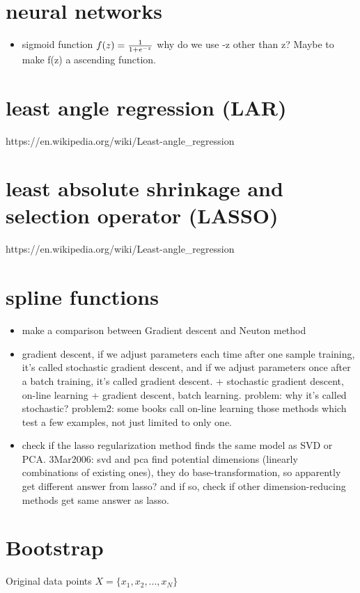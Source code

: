 \documentclass[10pt,a4paper]{book}
\begin{document}
\section {neural networks}
\begin{itemize}
\item sigmoid function  
$f(z) = {1 \over {1 + e^{-z}}}$  
why do we use -z other than z? Maybe to make f(z) a ascending function.
\end{itemize}

\section {least angle regression (LAR)}
https://en.wikipedia.org/wiki/Least-angle\_regression

\section {least absolute shrinkage and selection operator (LASSO)}

https://en.wikipedia.org/wiki/Least-angle\_regression

\section{spline functions}
\begin{itemize}


\item make a comparison between Gradient descent and Neuton method   
\item gradient descent, if we adjust parameters each time after one sample training, it's called stochastic gradient descent, and if we adjust parameters once after a batch training, it's called gradient descent.   
+ stochastic gradient descent, on-line learning   
+ gradient descent, batch learning.    
problem: why it's called stochastic?
problem2: some books call on-line learning those methods which test a few examples, not just limited to only one.   

\item check if the lasso regularization method finds the same model as SVD or PCA. 3Mar2006: svd and pca find potential dimensions (linearly combinations of existing ones), they do base-transformation, so apparently get different answer from lasso? and if so, check if other dimension-reducing methods get same answer as lasso.
\end{itemize}


\section{Bootstrap}
Original data points $X=\{x_1,x_2,...,x_N\}$
\end{document}
